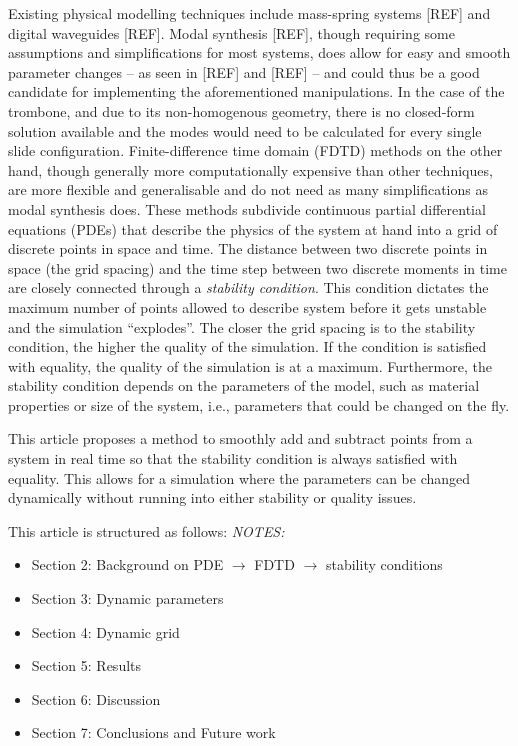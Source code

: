 \documentclass[dvipsnames, reprint]{JASA}
\def\SWcomment[#1]{\textcolor{Bittersweet}{#1}}
\begin{document}
Existing physical modelling techniques include mass-spring systems [REF] and digital waveguides [REF]. Modal synthesis [REF], though requiring some assumptions and simplifications for most systems, does allow for easy and smooth parameter changes -- as seen in [REF] and [REF] -- and could thus be a good candidate for implementing the aforementioned manipulations. \SWcomment[In the case of the trombone, and due to its non-homogenous geometry, there is no closed-form solution available and the modes would need to be calculated for every single slide configuration.] Finite-difference time domain (FDTD) methods on the other hand, though generally more computationally expensive than other techniques, are more flexible and generalisable and do not need as many simplifications as modal synthesis does. These methods subdivide continuous partial differential equations (PDEs) that describe the physics of the system at hand into a grid of discrete points in space and time. 
%
%
The distance between two discrete points in space (the grid spacing) and the time step between two discrete moments in time are closely connected through a \textit{stability condition}. This condition dictates the maximum number of points allowed to describe system before it gets unstable and the simulation ``explodes''. The closer the grid spacing is to the stability condition, the higher the quality of the simulation. If the condition is satisfied with equality, the quality of the simulation is at a maximum. 
Furthermore, the stability condition depends on the parameters of the model, such as material properties or size of the system, i.e., parameters that could be changed on the fly.

This article proposes a method to smoothly add and subtract points from a system in real time so that the stability condition is always satisfied with equality. This allows for a simulation where the parameters can be changed dynamically without running into either stability or quality issues. 

This article is structured as follows: 
\textit{NOTES:}
\begin{itemize}
\item Section 2: Background on PDE $\rightarrow$ FDTD $\rightarrow$ stability conditions 
\item Section 3: Dynamic parameters
\item Section 4: Dynamic grid
\item Section 5: Results
\item Section 6: Discussion
\item Section 7: Conclusions and Future work
\end{itemize}
\end{document}
